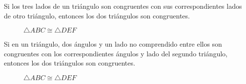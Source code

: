 \begin{postulate}
    Si los tres lados de un triángulo son congruentes con sus correspondientes lados de otro triángulo, entonces los dos triángulos son congruentes.

    \begin{figure}[h!]

        \centering

        \begin{subfigure}[b]{.5\textwidth}
            \centering
            
            \label{fig:congruence-lll1}
        \end{subfigure}%
        \begin{subfigure}[b]{.5\textwidth}
            \centering
            
            \label{fig:congruence-lll2}
        \end{subfigure}

        \centering
        \caption{$\triangle{ABC} \cong \triangle{DEF}$}
        \label{fig:congruencia-lll}
        
    \end{figure}    
    
\end{postulate}

\begin{postulate}
    Si en un triángulo, dos ángulos y un lado no comprendido entre ellos son congruentes con los correspondientes ángulos y lado del segundo triángulo, entonces los dos triángulos son congruentes.

    \begin{figure}[h!]

        \centering

        \begin{subfigure}[b]{.5\textwidth}
            \centering
            
            \label{fig:congruence-aal1}
        \end{subfigure}%
        \begin{subfigure}[b]{.5\textwidth}
            \centering
            
            \label{fig:congruence-aal2}
        \end{subfigure}

        \centering
        \caption{$\triangle{ABC} \cong \triangle{DEF}$}
        \label{fig:congruencia-aal}
        
    \end{figure}    
    
\end{postulate}

